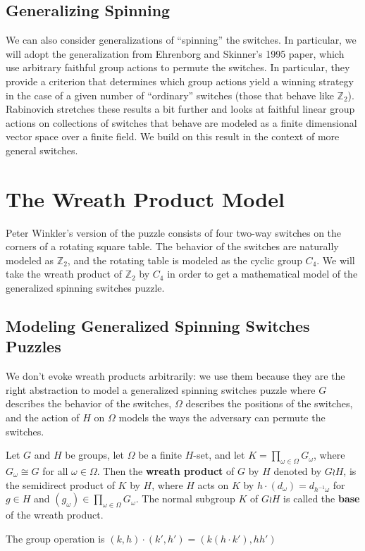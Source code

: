 \subsection{Generalizing Spinning}
We can also consider generalizations of ``spinning'' the switches.
In particular, we will adopt the generalization from
Ehrenborg and Skinner's \cite{Ehrenborg1995} 1995 paper, which use
arbitrary faithful group actions to permute the switches.
In particular, they provide a criterion that determines which group actions
yield a winning strategy in the case of a given number of ``ordinary'' switches
(those that behave like $\mathbb Z_2$).
Rabinovich \cite{Rabinovich2022} stretches these results a bit further and
looks at faithful linear group actions on collections of switches that behave
are modeled as a finite dimensional vector space over a finite field.
We build on this result in the context of more general switches.

\section{The Wreath Product Model}
\label{sec:WreathModel}
Peter Winkler's version of the puzzle consists of four two-way switches on the
corners of a rotating square table.
The behavior of the switches are naturally modeled as $\mathbb Z_2$, and
the rotating table is modeled as the cyclic group $C_4$. We will take the
wreath product of $\mathbb Z_2$ by $C_4$ in order to get a mathematical model
of the generalized spinning switches puzzle.

\subsection{Modeling Generalized Spinning Switches Puzzles}
We don't evoke wreath products arbitrarily: we use them because they are the
right abstraction to model a generalized spinning switches puzzle where
$G$ describes the behavior of the switches,
$\Omega$ describes the positions of the switches, and
the action of $H$ on $\Omega$ models the ways the adversary can permute the switches.

\begin{definition}
  Let $G$ and $H$ be groups,
  let $\Omega$ be a finite $H$-set, and
  let $K = \prod_{\omega \in \Omega} G_\omega$, where $G_\omega \cong G$
  for all $\omega \in \Omega$.
  Then the \textbf{wreath product} of $G$ by $H$ denoted by $G \wr H$,
  is the semidirect product of $K$ by $H$,
  where $H$ acts on $K$ by $h \cdot (d_\omega) = d_{h^{-1}\omega}$ for $g \in H$ and
  $(g_\omega) \in \prod_{\omega \in \Omega} G_\omega$.
  The normal subgroup $K$ of $G \wr H$ is called
  the \textbf{base} of the wreath product.

  The group operation is $(k, h) \cdot (k', h') = (k(h \cdot k'), hh')$
\end{definition}

